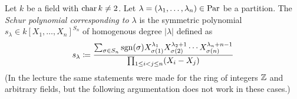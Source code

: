 \begin{example}[]
  Let $k$ be a field with $\operatorname{char} k \neq 2$.
  Let $\lambda = (\lambda_1, \dotsc, \lambda_n) \in \operatorname{Par}$ be a partition.
  The \emph{Schur polynomial corresponding to $\lambda$} is the symmetric polynomial $s_\lambda \in k[X_1, \dotsc, X_n]^{S_n}$ of homogenous degree $|\lambda|$ defined as
  \[
              s_\lambda
    \coloneqq \frac
              {
                \sum_{\sigma \in S_n} \operatorname{sgn}(\sigma)          X_{\sigma(1)}^{\lambda_1}
                                                            X_{\sigma(2)}^{\lambda_2 + 1}
                                                    \dotsm  X_{\sigma(n)}^{\lambda_n + n-1}
               }{
                \prod_{1 \leq i < j \leq n} (X_i - X_j)
               }
  \]
  (In the lecture the same statements were made for the ring of integers $\mathbb{Z}$ and arbitrary fields, but the following argumentation does not work in these cases.)
  

\end{example}
